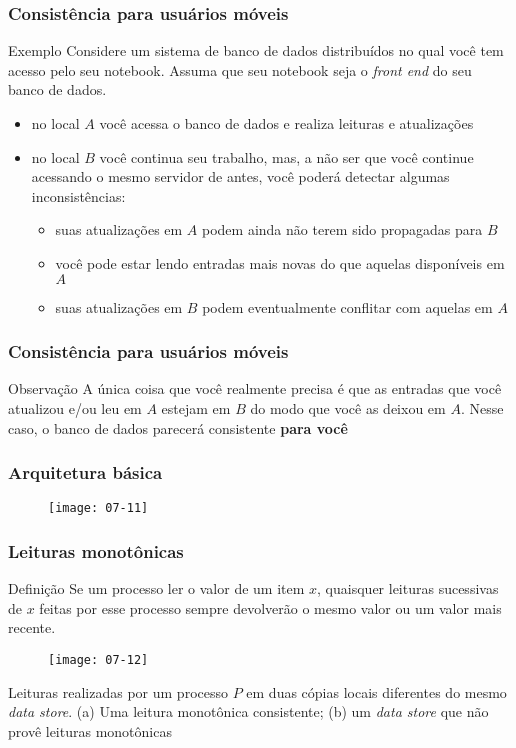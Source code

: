 \documentclass[Ligatures=TeX,table,brazil,svgnames,usetotalslideindicator,compress,10pt]{beamer}
\begin{document}
\begin{frame}
  \frametitle{Consistência para usuários móveis}
  \begin{exampleblock}{Exemplo}
    Considere um sistema de banco de dados distribuídos no qual você tem acesso pelo seu notebook. Assuma que seu notebook seja o \textit{front end} do seu banco de dados.
  \end{exampleblock}

  \begin{itemize}
  \item no local $A$ você acessa o banco de dados e realiza leituras e atualizações
  \item no local $B$ você continua seu trabalho, mas, a não ser que você continue acessando o mesmo servidor de antes, você poderá detectar algumas inconsistências:
    \begin{itemize}
    \item suas atualizações em $A$ podem ainda não terem sido propagadas para $B$
    \item você pode estar lendo entradas mais novas do que aquelas disponíveis em $A$
    \item suas atualizações em $B$ podem eventualmente conflitar com aquelas em $A$
    \end{itemize}
  \end{itemize}

\end{frame}

\begin{frame}
  \frametitle{Consistência para usuários móveis}
  \begin{alertblock}{Observação}
    A única coisa que você realmente precisa é que as entradas que você atualizou e/ou leu em $A$ estejam em $B$ do modo que você as deixou em $A$. Nesse caso, o banco de dados parecerá consistente \textbf{para você}
  \end{alertblock}
\end{frame}

\begin{frame}
  \frametitle{Arquitetura básica}
  \begin{figure}
    \centering
    \texttt{[image: 07-11]}
  \end{figure}
\end{frame}

\begin{frame}
  \frametitle{Leituras monotônicas}
  \begin{block}{Definição}
    Se um processo ler o valor de um item $x$, quaisquer leituras sucessivas de $x$ feitas por esse processo sempre devolverão o mesmo valor ou um valor mais recente.
  \end{block}

  \begin{figure}
    \centering
    \texttt{[image: 07-12]}
  \end{figure}

  \small
  Leituras realizadas por um processo $P$ em duas cópias locais diferentes do mesmo \textit{data store}. (a) Uma leitura monotônica consistente; (b) um \textit{data store} que não provê leituras monotônicas

\end{frame}
\end{document}
